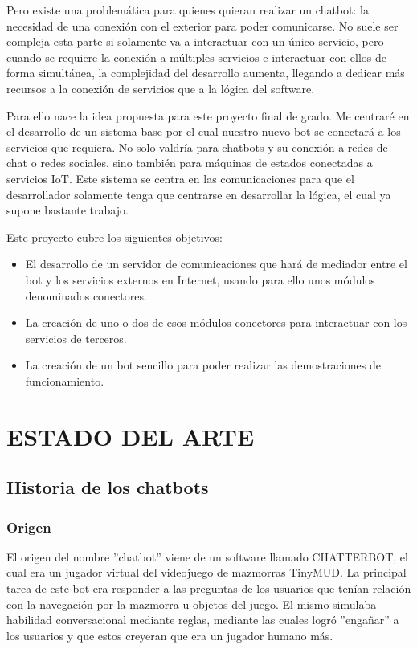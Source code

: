 \documentclass[spanish,12pt, a4paper, twoside]{paper}
\let\oldsection\section
\def\section{\cleardoublepage\oldsection}
\begin{document}
Pero existe una problemática para quienes quieran realizar un chatbot: la necesidad de una conexión con el exterior para poder comunicarse. No suele ser compleja esta parte si solamente va a interactuar con un único servicio, pero cuando se requiere la conexión a múltiples servicios e interactuar con ellos de forma simultánea, la complejidad del desarrollo aumenta, llegando a dedicar más recursos a la conexión de servicios que a la lógica del software.
\newline

Para ello nace la idea propuesta para este proyecto final de grado. Me centraré en el desarrollo de un sistema base por el cual nuestro nuevo bot se conectará a los servicios que requiera. No solo valdría para chatbots y su conexión a redes de chat o redes sociales, sino también para máquinas de estados conectadas a servicios IoT. Este sistema se centra en las comunicaciones para que el desarrollador solamente tenga que centrarse en desarrollar la lógica, el cual ya supone bastante trabajo.
\newline

Este proyecto cubre los siguientes objetivos:

\begin{itemize}
\item El desarrollo de un servidor de comunicaciones que hará de mediador entre el bot y los servicios externos en Internet, usando para ello unos módulos denominados conectores.
\item La creación de uno o dos de esos módulos conectores para interactuar con los servicios de terceros.
\item La creación de un bot sencillo para poder realizar las demostraciones de funcionamiento.
\end{itemize}

\section{ESTADO DEL ARTE}

\subsection{Historia de los chatbots}

\subsubsection{Origen}

El origen del nombre ''chatbot'' viene de un software llamado CHATTERBOT, el cual era un jugador virtual del videojuego de mazmorras TinyMUD. La principal tarea de este bot era responder a las preguntas de los usuarios que tenían relación con la navegación por la mazmorra u objetos del juego. El mismo simulaba habilidad conversacional mediante reglas, mediante las cuales logró ''engañar'' a los usuarios y que estos creyeran que era un jugador humano más. \cite[pág. 2]{CANLI}
\end{document}
